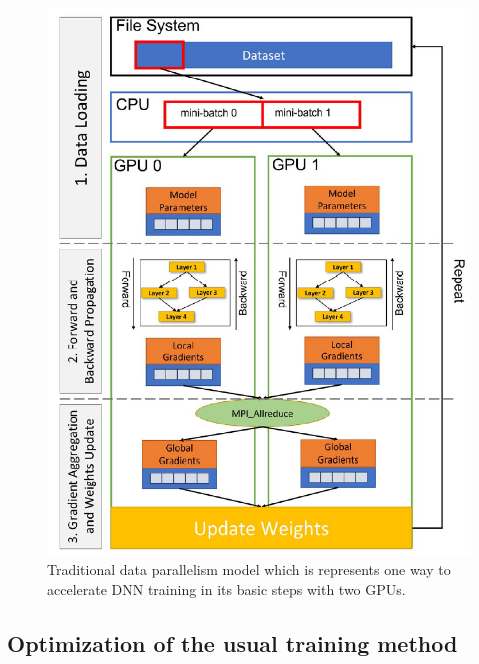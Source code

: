 \documentclass[conference]{IEEEtran}
\begin{document}
\begin{figure}[H]
    \centering
    \includegraphics[scale=0.46]{New_TraditionalDataParallelism.png}
    \caption{Traditional data parallelism model which is represents one way to accelerate DNN training in its basic steps with two GPUs. \cite{b11}}
    \label{fig:trad_paralelism}
\end{figure}

\vspace{\baselineskip}
\subsection{Optimization of the usual training method}
\end{document}
